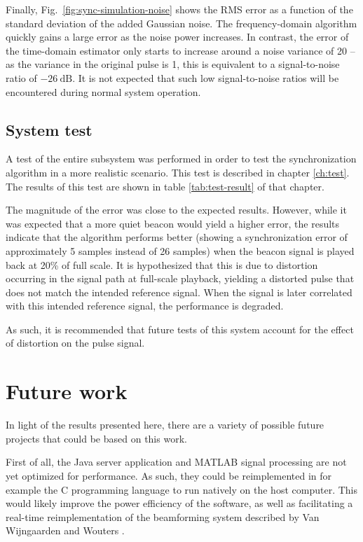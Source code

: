 \documentclass[a4paper, notitlepage]{report}
\begin{document}
Finally, Fig.~\ref{fig:sync-simulation-noise} shows the RMS error as a function of the standard deviation of the added Gaussian noise. The frequency-domain algorithm quickly gains a large error as the noise power increases. In contrast, the error of the time-domain estimator only starts to increase around a noise variance of 20 -- as the variance in the original pulse is 1, this is equivalent to a signal-to-noise ratio of $-26~\mathrm{dB}$. It is not expected that such low signal-to-noise ratios will be encountered during normal system operation.

\subsection{System test}
\label{sec:disc_test}
A test of the entire subsystem was performed in order to test the synchronization algorithm in a more realistic scenario. This test is described in chapter \ref{ch:test}. The results of this test are shown in table \ref{tab:test-result} of that chapter.

The magnitude of the error was close to the expected results. However, while it was expected that a more quiet beacon would yield a higher error, the results indicate that the algorithm performs better (showing a synchronization error of approximately 5 samples instead of 26 samples) when the beacon signal is played back at 20\% of full scale. It is hypothesized that this is due to distortion occurring in the signal path at full-scale playback, yielding a distorted pulse that does not match the intended reference signal. When the signal is later correlated with this intended reference signal, the performance is degraded.

As such, it is recommended that future tests of this system account for the effect of distortion on the pulse signal.

\section{Future work}
In light of the results presented here, there are a variety of possible future projects that could be based on this work.

First of all, the Java server application and MATLAB signal processing are not yet optimized for performance. As such, they could be reimplemented in for example the C programming language to run natively on the host computer. This would likely improve the power efficiency of the software, as well as facilitating a real-time reimplementation of the beamforming system described by Van Wijngaarden and Wouters \cite{BAP:ErikNiels}.
\end{document}
